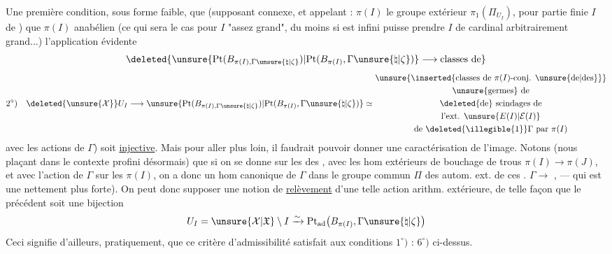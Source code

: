 Une première condition, sous forme faible,  que (supposant  connexe, et appelant : $\pi(I)$ le groupe extérieur $\pi_1(\Pi_{U_I})$, pour  partie finie $I$ de ) que  $\pi(I)$ anabélien (ce qui sera le cas pour $I$ "assez grand",
du moins si  est infini   puisse prendre $I$ de cardinal arbitrairement grand...)  l'application évidente
\[
\deleted{\unsure{\mathrm{Pt}(B_{\pi(I),\Gamma\unsure{\natural|\zeta}})|\mathrm{Pt}(B_{\pi(I)},\Gamma\unsure{\natural|\zeta})}\longrightarrow\text{classes de}}
\]
\[
2^\circ)\quad
\deleted{\unsure{\mathcal X}}U_I\longrightarrow
\unsure{\mathrm{Pt}(B_{\pi(I),\Gamma\unsure{\natural|\zeta}})|\mathrm{Pt}(B_{\pi(I)},\Gamma\unsure{\natural|\zeta})}
\simeq
\begin{gathered}
\unsure{\inserted{\text{classes de }\pi(I)\text{-conj. }\unsure{\text{de}|\text{des}}}}\\
\unsure{\text{germes}}\text{ de}\\
\deleted{\text{de}}\text{ scindages de}\\
\text{l'ext. }\unsure{E(I)|\mathcal E(I)}\\
\text{de }\deleted{\illegible{1}}\Gamma\text{ par }\pi(I)
\end{gathered}
\]
 avec les actions de $\Gamma$) soit \uline{injective}. Mais pour aller plus loin, il faudrait pouvoir donner une caractérisation de l'image. Notons (nous plaçant dans le contexte profini désormais) que si on se donne sur les  des ,  avec les hom extérieurs de bouchage de trous $\pi(I)\longrightarrow\pi(J)$, et avec l'action de $\Gamma$ sur les $\pi(I)$, on a donc un
hom canonique de $\Gamma$ dans le groupe commun  $\Pi$ des autom.  ext. de ces .
 \unsure{$=$|$\simeq$} $\Gamma\longrightarrow$ , --- qui est  une  nettement plus forte). On peut donc
supposer  une notion de \uline{relèvement}
 d'une telle action arithm.
extérieure, de telle façon que le
 précédent soit une bijection
\[
 U_I=\unsure{\mathcal X|\mathfrak X}\setminus I
 \xrightarrow{\sim}
 \mathrm{Pt}_{\mathrm{ad}}\bigl(B_{\pi(I)},\Gamma\unsure{\natural|\zeta}\bigr)
\]
Ceci signifie d'ailleurs, pratiquement,
que ce critère d'admissibilité satisfait
aux conditions $1^\circ)$ : $6^\circ)$  ci-dessus.

